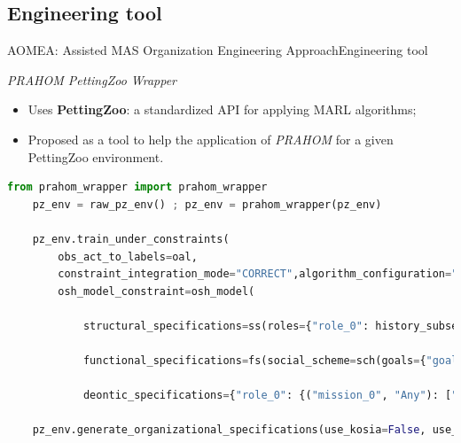\subsection{Engineering tool}

\begin{frame}[fragile]{AOMEA: Assisted MAS Organization Engineering Approach}{Engineering tool}

    \begin{block}{\emph{PRAHOM PettingZoo Wrapper}\label{PettingZoo-wrapper}}
        \begin{itemize}
            \item Uses \textbf{PettingZoo}: a standardized API for applying MARL algorithms;
            \item Proposed as a tool to help the application of \emph{PRAHOM} for a given PettingZoo environment.
        \end{itemize}
    \end{block}

    \begin{lstlisting}[language=Python,basicstyle=\scriptsize]
    from prahom_wrapper import prahom_wrapper
    pz_env = raw_pz_env() ; pz_env = prahom_wrapper(pz_env)
    
    pz_env.train_under_constraints(
        obs_act_to_labels=oal,
        constraint_integration_mode="CORRECT",algorithm_configuration="default_MAPPO"
        osh_model_constraint=osh_model(
            
            structural_specifications=ss(roles={"role_0": history_subset(pattern="[o0,a1](1,4),[o1,a2](1,2)")},role_inheritance_relations=None, root_groups=None),
            
            functional_specifications=fs(social_scheme=sch(goals={"goal_0": history_subset(pattern="[#Any](0,*),[obs_goal_0]")},missions=["mission_0"], goals_structure=None,mission_to_goals={"mission_0": ["goal_0"]},mission_to_agent_cardinality=None),social_preferences=None),

            deontic_specifications={"role_0": {("mission_0", "Any"): ["agent_0", "agent_4"]}}))

    pz_env.generate_organizational_specifications(use_kosia=False, use_gosia=True,gosia_configuration={"generate_figures": True})\end{lstlisting}

\end{frame}
